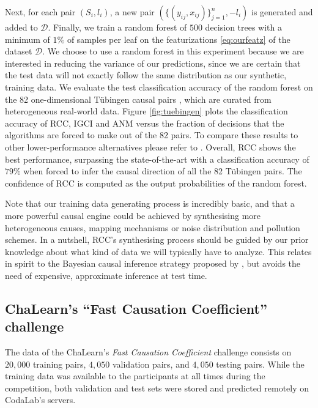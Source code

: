 \documentclass[twoside,11pt,a4paper]{article}
\begin{document}
Next, for each pair $(S_i, l_i)$, a new pair $(\{(y_{ij},x_{ij})\}_{j=1}^n,
-l_i)$ is generated and added to $\mathcal{D}$.  Finally, we train a random
forest of $500$ decision trees with a minimum of $1\%$ of samples per leaf on
the featurizations \eqref{eq:ourfeatz} of the dataset $\mathcal{D}$. We choose
to use a random forest in this experiment because we are interested in reducing
the variance of our predictions, since we are certain that the test data will
not exactly follow the same distribution as our synthetic, training data. We
evaluate the test classification accuracy of the random forest on the 82
one-dimensional T\"ubingen causal pairs \citep{Peters14:ANM,Tuebingen14}, which
are curated from heterogeneous real-world data. Figure \ref{fig:tuebingen}
plots the classification accuracy of RCC, IGCI and ANM versus the fraction of
decisions that the algorithms are forced to make out of the 82 pairs. To
compare these results to other lower-performance alternatives please refer to
\citep{Janzing12}. Overall, RCC shows the best performance, surpassing the
state-of-the-art with a classification accuracy of $79\%$ when forced to infer
the causal direction of all the 82 T\"ubingen pairs. The confidence of RCC is
computed as the output probabilities of the random forest.

Note that our training data generating process is incredibly basic, and that a
more powerful causal engine could be achieved by synthesising more
heterogeneous causes, mapping mechanisms or noise distribution and pollution
schemes. In a nutshell, RCC's synthesising process should be guided by our
prior knowledge about what kind of data we will typically have to analyze.
This relates in spirit to the Bayesian causal inference strategy proposed by
\citet{Stegle10}, but avoids the need  of expensive, approximate inference at
test time.

\subsection{ChaLearn's ``Fast Causation Coefficient'' challenge}

The data of the ChaLearn's \emph{Fast Causation Coefficient} challenge
\citep{Codalab14} consists on $20,000$ training pairs, $4,050$ validation
pairs, and $4,050$ testing pairs. While the training data was available to the
participants at all times during the competition, both validation and test sets
were stored and predicted remotely on CodaLab's servers.
\end{document}

